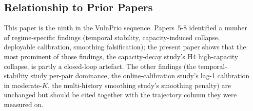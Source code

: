 \subsection{Relationship to Prior Papers}

This paper is the ninth in the VulnPrio sequence. Papers~5-8
identified a number of regime-specific findings (temporal stability,
capacity-induced collapse, deployable calibration, smoothing
falsification); the present paper shows that the most prominent of
those findings, the capacity-decay study's H4 high-capacity collapse, is partly
a closed-loop artefact. The other findings (the temporal-stability study per-pair dominance,
the online-calibration study's lag-1 calibration in moderate-$K$, the multi-history smoothing study's smoothing
penalty) are unchanged but should be cited together with the
trajectory column they were measured on.
